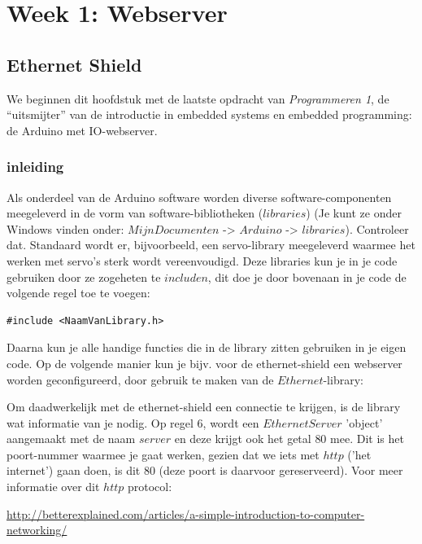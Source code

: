 \chapter{Week 1: Webserver}

\section{Ethernet Shield}

We beginnen dit hoofdstuk met de laatste opdracht van \textit{Programmeren 1}, de “uitsmijter” van de introductie in embedded systems en embedded programming: de Arduino met IO-webserver.

\subsection*{inleiding}
Als onderdeel van de Arduino software worden diverse software-componenten meegeleverd in de vorm van software-bibliotheken ($libraries$) (Je kunt ze onder Windows vinden onder: $Mijn Documenten$ -> $Arduino$ -> $libraries$). Controleer dat. Standaard wordt er, bijvoorbeeld, een servo-library meegeleverd waarmee het werken met servo’s sterk wordt vereenvoudigd. Deze libraries kun je in je code gebruiken door ze zogeheten te $includen$, dit doe je door bovenaan in je code de volgende regel toe te voegen:

\begin{lstlisting}[language=Arduino]
#include <NaamVanLibrary.h>
\end{lstlisting}

Daarna kun je alle handige functies die in de library zitten gebruiken in je eigen code. Op de volgende manier kun je bijv. voor de ethernet-shield een webserver worden geconfigureerd, door gebruik te maken van de $Ethernet$-library:



Om daadwerkelijk met de ethernet-shield een connectie te krijgen, is de library wat informatie van je nodig. Op regel $6$, wordt een $EthernetServer$ 'object' aangemaakt met de naam $server$ en deze krijgt ook het getal $80$ mee. Dit is het poort-nummer waarmee je gaat werken, gezien dat we iets met $http$ ('het internet') gaan doen, is dit $80$ (deze poort is daarvoor gereserveerd). Voor meer informatie over dit $http$ protocol:

\url{http://betterexplained.com/articles/a-simple-introduction-to-computer-networking/}

